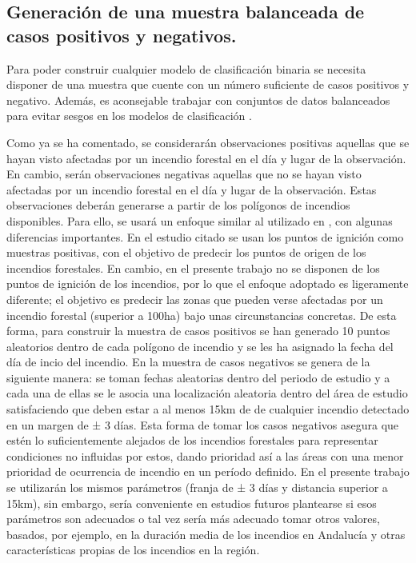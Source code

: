 \documentclass[12pt,a4paper,]{book}
\numberwithin{dummy}{section}
\theoremstyle{ocrenumbox}
\theoremstyle{blacknumex}
\theoremstyle{blacknumbox}
\theoremstyle{ocrenum}
\theoremstyle{ocrenum}
\begin{document}
\hypertarget{generaciuxf3n-de-una-muestra-balanceada-de-casos-positivos-y-negativos.}{%
\subsection{Generación de una muestra balanceada de casos positivos y
negativos.}\label{generaciuxf3n-de-una-muestra-balanceada-de-casos-positivos-y-negativos.}}

Para poder construir cualquier modelo de clasificación binaria se
necesita disponer de una muestra que cuente con un número suficiente de
casos positivos y negativo. Además, es aconsejable trabajar con
conjuntos de datos balanceados para evitar sesgos en los modelos de
clasificación \citep{THABTAH2020429}.

Como ya se ha comentado, se considerarán observaciones positivas
aquellas que se hayan visto afectadas por un incendio forestal en el día
y lugar de la observación. En cambio, serán observaciones negativas
aquellas que no se hayan visto afectadas por un incendio forestal en el
día y lugar de la observación. Estas observaciones deberán generarse a
partir de los polígonos de incendios disponibles. Para ello, se usará un
enfoque similar al utilizado en \citep{tojanova2006}, con algunas
diferencias importantes. En el estudio citado se usan los puntos de
ignición como muestras positivas, con el objetivo de predecir los puntos
de origen de los incendios forestales. En cambio, en el presente trabajo
no se disponen de los puntos de ignición de los incendios, por lo que el
enfoque adoptado es ligeramente diferente; el objetivo es predecir las
zonas que pueden verse afectadas por un incendio forestal (superior a
100ha) bajo unas circunstancias concretas. De esta forma, para construir
la muestra de casos positivos se han generado 10 puntos aleatorios
dentro de cada polígono de incendio y se les ha asignado la fecha del
día de incio del incendio. En \citet{tojanova2006} la muestra de casos
negativos se genera de la siguiente manera: se toman fechas aleatorias
dentro del periodo de estudio y a cada una de ellas se le asocia una
localización aleatoria dentro del área de estudio satisfaciendo que
deben estar a al menos 15km de de cualquier incendio detectado en un
margen de ± 3 días. Esta forma de tomar los casos negativos asegura que
estén lo suficientemente alejados de los incendios forestales para
representar condiciones no influidas por estos, dando prioridad así a
las áreas con una menor prioridad de ocurrencia de incendio en un
período definido. En el presente trabajo se utilizarán los mismos
parámetros (franja de ± 3 días y distancia superior a 15km), sin
embargo, sería conveniente en estudios futuros plantearse si esos
parámetros son adecuados o tal vez sería más adecuado tomar otros
valores, basados, por ejemplo, en la duración media de los incendios en
Andalucía y otras características propias de los incendios en la región.
\end{document}

